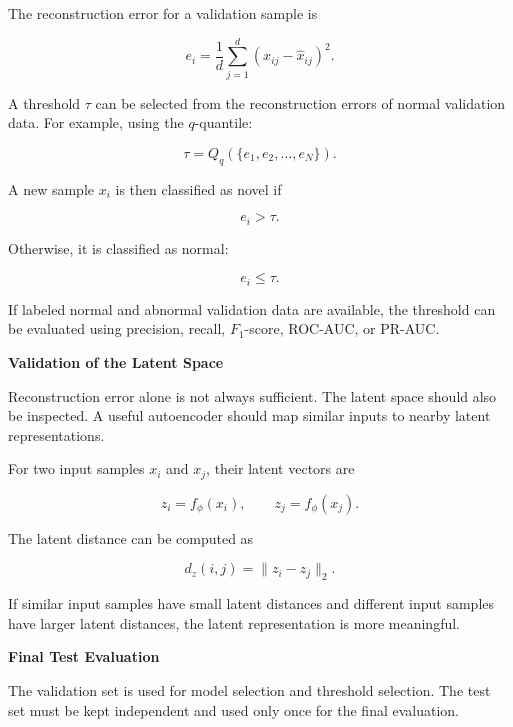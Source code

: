 \documentclass{book}
\providecommand{\ProjectDeepHeading}[2]{%
    \par\medskip\noindent\textbf{#2}\par\smallskip
}
\begin{document}
        The reconstruction error for a validation sample is
        
        \[
            e_i
            =
            \frac{1}{d}
            \sum_{j=1}^{d}
            (x_{ij}-\hat{x}_{ij})^2.
        \]
        
        A threshold \(\ensuremath{\tau}\) can be selected from the reconstruction errors of normal validation data.
        For example, using the \(q\)-quantile:
        
        \[
            \ensuremath{\tau}
            =
            Q_q
            (
            \{e_1,e_2,\dots,e_N\}
            ).
        \]
        
        A new sample \(x_i\) is then classified as novel if
        
        \[
            e_i > \ensuremath{\tau}.
        \]
        
        Otherwise, it is classified as normal:
        
        \[
            e_i \leq \ensuremath{\tau}.
        \]
        
        If labeled normal and abnormal validation data are available, the threshold can be evaluated using precision, recall, \(F_1\)-score, ROC-AUC, or PR-AUC.
    
    
    \ProjectDeepHeading{4}{Validation of the Latent Space}
        
        Reconstruction error alone is not always sufficient.
        The latent space should also be inspected.
        A useful autoencoder should map similar inputs to nearby latent representations.
        
        For two input samples \(x_i\) and \(x_j\), their latent vectors are
        
        \[
            z_i=f_{\ensuremath{\phi}}(x_i),
            \qquad
            z_j=f_{\ensuremath{\phi}}(x_j).
        \]
        
        The latent distance can be computed as
        
        \[
            d_z(i,j)
            =
            \|z_i-z_j\|_2.
        \]
        
        If similar input samples have small latent distances and different input samples have larger latent distances, the latent representation is more meaningful.
    
    
    \ProjectDeepHeading{4}{Final Test Evaluation}
        
        The validation set is used for model selection and threshold selection.
        The test set must be kept independent and used only once for the final evaluation.
        
\end{document}
